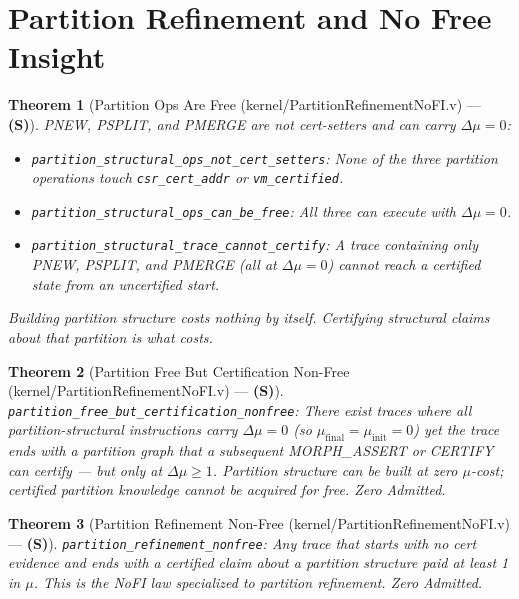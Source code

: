 \documentclass[11pt, a4paper]{report}
\theoremstyle{definition}
\theoremstyle{plain}
\newtheorem{theorem}{Theorem}[chapter]
\begin{document}
\section{Partition Refinement and No Free Insight}

\begin{theorem}[Partition Ops Are Free {\normalfont (kernel/PartitionRefinementNoFI.v)} --- \textbf{(S)}]
PNEW, PSPLIT, and PMERGE are not cert-setters and can carry $\Delta\mu = 0$:
\begin{itemize}
    \item \texttt{partition\_structural\_ops\_not\_cert\_setters}: None of the three partition operations touch \texttt{csr\_cert\_addr} or \texttt{vm\_certified}.
    \item \texttt{partition\_structural\_ops\_can\_be\_free}: All three can execute with $\Delta\mu = 0$.
    \item \texttt{partition\_structural\_trace\_cannot\_certify}: A trace containing only PNEW, PSPLIT, and PMERGE (all at $\Delta\mu = 0$) cannot reach a certified state from an uncertified start.
\end{itemize}
Building partition structure costs nothing by itself. Certifying structural claims about that partition is what costs.
\end{theorem}

\begin{theorem}[Partition Free But Certification Non-Free {\normalfont (kernel/PartitionRefinementNoFI.v)} --- \textbf{(S)}]
\label{thm:partition_nfi}
\texttt{partition\_free\_but\_certification\_nonfree}: There exist traces where all partition-structural instructions carry $\Delta\mu = 0$ (so $\mu_{\mathrm{final}} = \mu_{\mathrm{init}} = 0$) yet the trace ends with a partition graph that a subsequent MORPH\_ASSERT or CERTIFY can certify --- but only at $\Delta\mu \ge 1$. Partition structure can be built at zero $\mu$-cost; certified partition knowledge cannot be acquired for free. Zero Admitted.
\end{theorem}

\begin{theorem}[Partition Refinement Non-Free {\normalfont (kernel/PartitionRefinementNoFI.v)} --- \textbf{(S)}]
\texttt{partition\_refinement\_nonfree}: Any trace that starts with no cert evidence and ends with a certified claim about a partition structure paid at least 1 in $\mu$. This is the NoFI law specialized to partition refinement. Zero Admitted.
\end{theorem}
\end{document}

